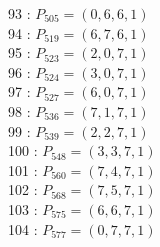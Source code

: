 \documentclass{article}
\begin{document}
{\begin{multicols}{3}
93 : $P_{505}=( 0, 6, 6, 1 )$\\
94 : $P_{519}=( 6, 7, 6, 1 )$\\
95 : $P_{523}=( 2, 0, 7, 1 )$\\
96 : $P_{524}=( 3, 0, 7, 1 )$\\
97 : $P_{527}=( 6, 0, 7, 1 )$\\
98 : $P_{536}=( 7, 1, 7, 1 )$\\
99 : $P_{539}=( 2, 2, 7, 1 )$\\
100 : $P_{548}=( 3, 3, 7, 1 )$\\
101 : $P_{560}=( 7, 4, 7, 1 )$\\
102 : $P_{568}=( 7, 5, 7, 1 )$\\
103 : $P_{575}=( 6, 6, 7, 1 )$\\
104 : $P_{577}=( 0, 7, 7, 1 )$\\
\end{multicols}


%


%


}%
\end{document}
